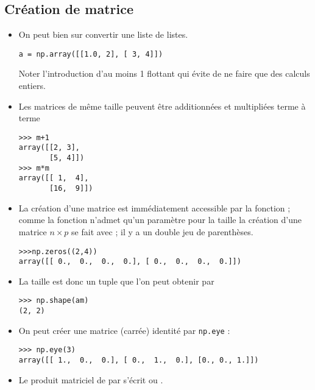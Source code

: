 \subsection{Création de matrice}
\begin{itemize}
\item On peut bien sur convertir une liste de listes.
\begin{lstlisting}
a = np.array([[1.0, 2], [ 3, 4]])
\end{lstlisting}
Noter l'introduction d'au moins 1 flottant qui évite de ne faire que des calculs entiers.
\item Les matrices de même taille peuvent être additionnées et multipliées terme à terme 
\begin{lstlisting}
>>> m+1
array([[2, 3],
       [5, 4]])
>>> m*m
array([[ 1,  4],
       [16,  9]])
\end{lstlisting}
\item La création d'une matrice est immédiatement accessible par la fonction  ; comme la fonction n'admet qu'un paramètre pour la taille la création d'une matrice $n\times p$ se fait avec  ; il y a un double jeu de parenthèses.
\begin{lstlisting}
>>>np.zeros((2,4))
array([[ 0.,  0.,  0.,  0.], [ 0.,  0.,  0.,  0.]])
\end{lstlisting}
\item La taille est donc un tuple que l'on peut obtenir par 
\begin{lstlisting}
>>> np.shape(am)
(2, 2)
\end{lstlisting}
\item On peut créer une matrice (carrée) identité par {\tt np.eye} :
\begin{lstlisting}
>>> np.eye(3)
array([[ 1.,  0.,  0.], [ 0.,  1.,  0.], [0., 0., 1.]])
\end{lstlisting}
\item Le produit matriciel de  par  s'écrit  ou  .
\end{itemize}

